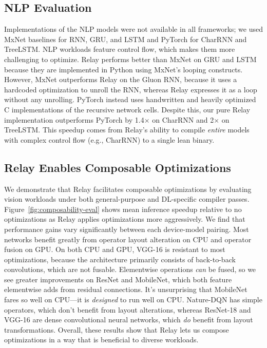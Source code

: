\subsection{NLP Evaluation}
Implementations of the NLP models were not available in all frameworks;
  we used MxNet baselines for RNN, GRU, and LSTM and PyTorch for CharRNN and TreeLSTM.
NLP workloads feature control flow,
  which makes them more challenging to optimize.
Relay performs better than MxNet on GRU and LSTM
  because they are implemented in Python using
  MxNet's looping constructs.
However,
  MxNet outperforms Relay on the Gluon RNN,
  because it uses a hardcoded optimization to unroll the RNN,
  whereas Relay expresses it as a loop without any unrolling.
PyTorch instead uses handwritten and heavily optimized
  C implementations of the recursive network cells.
Despite this,
  our pure Relay implementation outperforms PyTorch by 1.4$\times$ on
  CharRNN and 2$\times$ on TreeLSTM.
This speedup comes from Relay's ability to compile \textit{entire}
  models with complex control flow (e.g., CharRNN) to a single lean binary.

\subsection{Relay Enables Composable Optimizations}
\label{sec:eval_opts}

We demonstrate that Relay facilitates composable optimizations
  by evaluating vision workloads under both general-purpose and DL-specific compiler passes.
Figure~\ref{fig:composability-eval} shows mean inference speedup relative to
  no optimizations as Relay applies optimizations more aggressively.
We find that performance gains vary significantly between each device-model pairing.
Most networks benefit greatly from operator layout alteration on CPU and operator fusion on GPU.
On both CPU and GPU,
  VGG-16 is resistant to most optimizations,
  because the architecture primarily consists of back-to-back convolutions,
  which are not fusable.
Elementwise operations \textit{can} be fused,
  so we see greater improvements on ResNet and MobileNet,
  which both feature elementwise adds from residual connections.
It's unsurprising that MobileNet fares so well on CPU---it is \textit{designed} to run well on CPU.
Nature-DQN has simple operators,
  which don't benefit from layout alterations,
  whereas ResNet-18 and VGG-16 are dense convolutional neural networks,
  which \textit{do} benefit from layout transformations.
Overall, these results show that Relay lets us compose optimizations
  in a way that is beneficial to diverse workloads.

